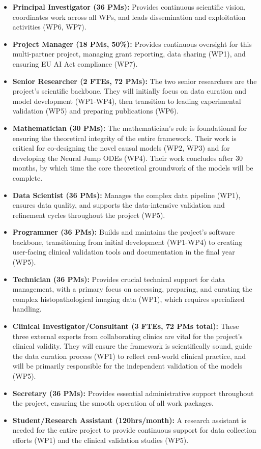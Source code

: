 \documentclass[11pt, a4paper]{article}
\begin{document}
\begin{itemize}
    \item \textbf{Principal Investigator (36 PMs):} Provides continuous scientific vision, coordinates work across all WPs, and leads dissemination and exploitation activities (WP6, WP7).
    \item \textbf{Project Manager (18 PMs, 50\%):} Provides continuous oversight for this multi-partner project, managing grant reporting, data sharing (WP1), and ensuring EU AI Act compliance (WP7).
    \item \textbf{Senior Researcher (2 FTEs, 72 PMs):} The two senior researchers are the project's scientific backbone. They will initially focus on data curation and model development (WP1-WP4), then transition to leading experimental validation (WP5) and preparing publications (WP6).
    \item \textbf{Mathematician (30 PMs):} The mathematician's role is foundational for ensuring the theoretical integrity of the entire framework. Their work is critical for co-designing the novel causal models (WP2, WP3) and for developing the Neural Jump ODEs (WP4). Their work concludes after 30 months, by which time the core theoretical groundwork of the models will be complete.
    \item \textbf{Data Scientist (36 PMs):} Manages the complex data pipeline (WP1), ensures data quality, and supports the data-intensive validation and refinement cycles throughout the project (WP5).
    \item \textbf{Programmer (36 PMs):} Builds and maintains the project's software backbone, transitioning from initial development (WP1-WP4) to creating user-facing clinical validation tools and documentation in the final year (WP5).
    \item \textbf{Technician (36 PMs):} Provides crucial technical support for data management, with a primary focus on accessing, preparing, and curating the complex histopathological imaging data (WP1), which requires specialized handling.
    \item \textbf{Clinical Investigator/Consultant (3 FTEs, 72 PMs total):} These three external experts from collaborating clinics are vital for the project's clinical validity. They will ensure the framework is scientifically sound, guide the data curation process (WP1) to reflect real-world clinical practice, and will be primarily responsible for the independent validation of the models (WP5).
    \item \textbf{Secretary (36 PMs):} Provides essential administrative support throughout the project, ensuring the smooth operation of all work packages.
    \item \textbf{Student/Research Assistant (120hrs/month):} A research assistant is needed for the entire project to provide continuous support for data collection efforts (WP1) and the clinical validation studies (WP5).
\end{itemize}
\end{document}
